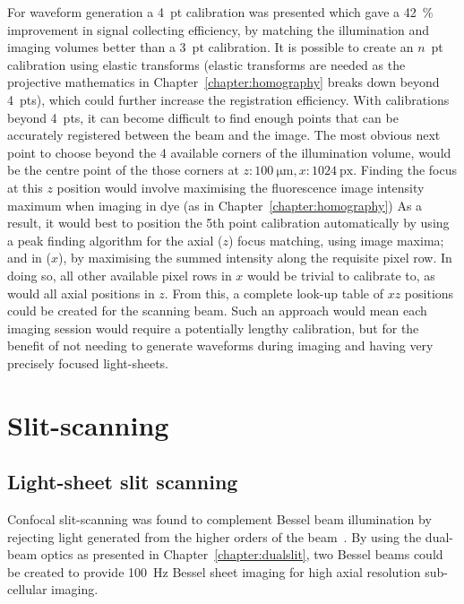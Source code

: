 For waveform generation a 4~pt calibration was presented which gave a \SI{42}{\percent} improvement in signal collecting efficiency, by matching the illumination and imaging volumes better than a 3~pt calibration.
It is possible to create an \(n\)~pt calibration using elastic transforms (elastic transforms are needed as the projective mathematics in Chapter~\ref{chapter:homography} breaks down beyond 4~pts), which could further increase the registration efficiency.
With calibrations beyond 4~pts, it can become difficult to find enough points that can be accurately registered between the beam and the image.
The most obvious next point to choose beyond the 4 available corners of the illumination volume, would be the centre point of the those corners at \(z:\SI{100}{\micro\meter},x:\SI{1024}{\text{px}}\).
Finding the focus at this \(z\) position would involve maximising the fluorescence image intensity maximum when imaging in dye (as in Chapter~\ref{chapter:homography})%
As a result, it would best to position the 5th point calibration automatically by using a peak finding algorithm for the axial (\(z\)) focus matching, using image maxima; and in (\(x\)), by maximising the summed intensity along the requisite pixel row.
In doing so, all other available pixel rows in \(x\) would be trivial to calibrate to, as would all axial positions in \(z\).
From this, a complete look-up table of \(xz\) positions could be created for the scanning beam.
Such an approach would mean each imaging session would require a potentially lengthy calibration, but for the benefit of not needing to generate waveforms during imaging and having very precisely focused light-sheets.

\section{Slit-scanning}

\subsection{Light-sheet slit scanning}

Confocal slit-scanning was found to complement Bessel beam illumination by rejecting light generated from the higher orders of the beam~\cite{fahrbach_rapid_2013}.
By using the dual-beam optics as presented in Chapter~\ref{chapter:dualslit}, two Bessel beams could be created to provide \SI{100}{\hertz} Bessel sheet imaging for high axial resolution sub-cellular imaging.

